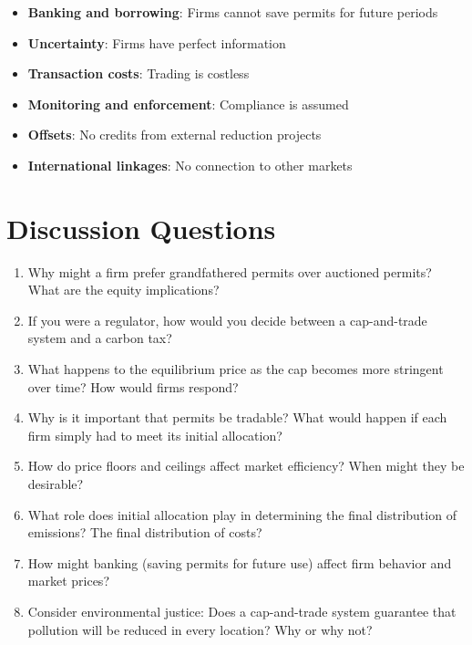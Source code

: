 \documentclass{tufte-handout}\usepackage[]{graphicx}\usepackage[]{xcolor}
\begin{document}
\begin{itemize}
\item \textbf{Banking and borrowing}: Firms cannot save permits for future periods
\item \textbf{Uncertainty}: Firms have perfect information
\item \textbf{Transaction costs}: Trading is costless
\item \textbf{Monitoring and enforcement}: Compliance is assumed
\item \textbf{Offsets}: No credits from external reduction projects
\item \textbf{International linkages}: No connection to other markets
\end{itemize}

\section{Discussion Questions}

\begin{enumerate}
\item Why might a firm prefer grandfathered permits over auctioned permits? What are the equity implications?

\item If you were a regulator, how would you decide between a cap-and-trade system and a carbon tax?

\item What happens to the equilibrium price as the cap becomes more stringent over time? How would firms respond?

\item Why is it important that permits be tradable? What would happen if each firm simply had to meet its initial allocation?

\item How do price floors and ceilings affect market efficiency? When might they be desirable?

\item What role does initial allocation play in determining the final distribution of emissions? The final distribution of costs?

\item How might banking (saving permits for future use) affect firm behavior and market prices?

\item Consider environmental justice: Does a cap-and-trade system guarantee that pollution will be reduced in every location? Why or why not?
\end{enumerate}
\end{document}
